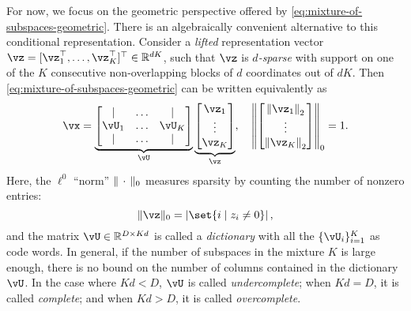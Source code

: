 \documentclass[\toplevelprefix/book-main.tex]{subfiles}
\begin{document}
For now, we focus on the geometric perspective offered by \eqref{eq:mixture-of-subspaces-geometric}.
There is an algebraically convenient alternative to this conditional representation. Consider a \textit{lifted} representation vector $\vz = [\vz_1^\top, \dots, \vz_K^\top]^\top \in \R^{dK}$, such that $\vz$ is \textit{$d$-sparse} with support on one of the $K$ consecutive non-overlapping blocks of $d$ coordinates out of $dK$. 
Then \eqref{eq:mixture-of-subspaces-geometric} can be written equivalently as
\begin{equation}\label{eq:mixture-of-subspaces-dictionary-pre}
    \vx = 
    \underbrace{
    \begin{bmatrix} 
    | & \hdots & |  \\
    \vU_1 & \hdots & \vU_K  \\
    | & \hdots & | 
    \end{bmatrix} 
    }_{\vU}
    \underbrace{
    \begin{bmatrix} \vz_1 \\ \vdots \\ \vz_K \end{bmatrix}
    }_{\vz},
    \quad
    \norm*{
    \begin{bmatrix} \norm*{\vz_1}_2 \\ \vdots \\ \norm*{\vz_K}_2 \end{bmatrix}
    }_0 = 1.
\end{equation}
Here, the $\ell^0$ ``norm'' $\norm{\,\cdot\,}_0$ measures sparsity by counting the number of nonzero entries:
\begin{equation}\label{eq:ell-zero-norm}
    \norm{\vz}_0 = \abs*{\set{i \given z_i \neq 0}},
\end{equation}
and the matrix $\vU \in \R^{D \times Kd}$ is called a \textit{dictionary} with all the $\{\vU_i\}_{i=1}^K$ as code words. In general, if the number of subspaces in the mixture $K$ is large enough, there is no bound on the number of columns contained in the dictionary $\vU$. In the case where $Kd < D$, $\vU$ is called \textit{undercomplete};
when $Kd = D$, it is called \textit{complete}; and when $Kd > D$, it is called \textit{overcomplete}. 
\end{document}
